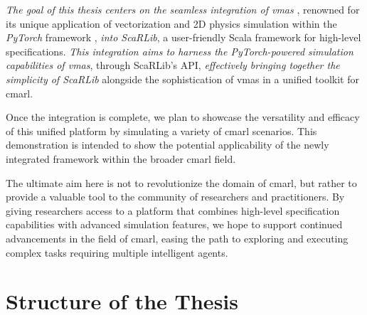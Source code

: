\documentclass[12pt,a4paper,openright,twoside]{book}
\begin{document}
\emph{The goal of this thesis centers on the seamless integration of \ac{vmas}} \cite{bettini2022vmas}, renowned for its unique application of vectorization and 2D physics simulation within the \emph{PyTorch} framework \cite{paszke2019pytorch}, \emph{into ScaRLib}, a user-friendly Scala framework for high-level specifications. \emph{This integration aims to harness the PyTorch-powered simulation capabilities of \ac{vmas}}, through ScaRLib's API, \emph{effectively bringing together the simplicity of ScaRLib} alongside the sophistication of \ac{vmas} in a unified toolkit for \ac{cmarl}.

Once the integration is complete, we plan to showcase the versatility and efficacy of this unified platform by simulating a variety of \ac{cmarl} scenarios. This demonstration is intended to show the potential applicability of the newly integrated framework within the broader \ac{cmarl} field.

The ultimate aim here is not to revolutionize the domain of \ac{cmarl}, but rather to provide a valuable tool to the community of researchers and practitioners. By giving researchers access to a platform that combines high-level specification capabilities with advanced simulation features, we hope to support continued advancements in the field of \ac{cmarl}, easing the path to exploring and executing complex tasks requiring multiple intelligent agents.
\newpage
\section{Structure of the Thesis}
\end{document}
